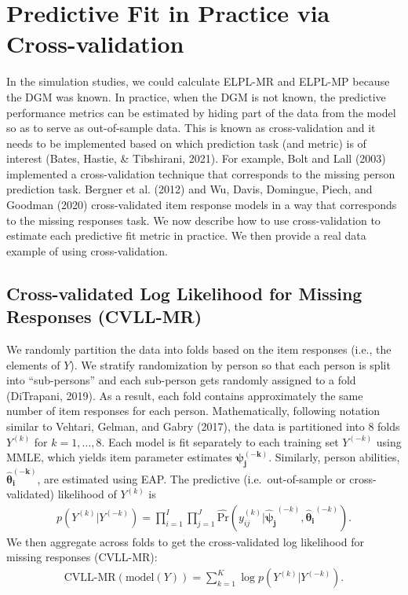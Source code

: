 \documentclass[
  english,
  man,floatsintext]{apa7}
\begin{document}
\hypertarget{real}{%
\section{Predictive Fit in Practice via Cross-validation}\label{real}}

In the simulation studies, we could calculate ELPL-MR and ELPL-MP because the DGM was known. In practice, when the DGM is not known, the predictive performance metrics can be estimated by hiding part of the data from the model so as to serve as out-of-sample data. This is known as cross-validation and it needs to be implemented based on which prediction task (and metric) is of interest (Bates, Hastie, \& Tibshirani, 2021). For example, Bolt and Lall (2003) implemented a cross-validation technique that corresponds to the missing person prediction task. Bergner et al. (2012) and Wu, Davis, Domingue, Piech, and Goodman (2020) cross-validated item response models in a way that corresponds to the missing responses task. We now describe how to use cross-validation to estimate each predictive fit metric in practice. We then provide a real data example of using cross-validation.

\hypertarget{cross-validated-log-likelihood-for-missing-responses-cvll-mr}{%
\subsection{Cross-validated Log Likelihood for Missing Responses (CVLL-MR)}\label{cross-validated-log-likelihood-for-missing-responses-cvll-mr}}

We randomly partition the data into folds based on the item responses (i.e., the elements of \(Y\)). We stratify randomization by person so that each person is split into ``sub-persons'' and each sub-person gets randomly assigned to a fold (DiTrapani, 2019). As a result, each fold contains approximately the same number of item responses for each person. Mathematically, following notation similar to Vehtari, Gelman, and Gabry (2017), the data is partitioned into 8 folds \(Y^{(k)}\) for \(k = 1, \dots, 8\). Each model is fit separately to each training set \(Y^{(-k)}\) using MMLE, which yields item parameter estimates \(\bm{\psi_j^{(-k)}}\). Similarly, person abilities, \(\bm{\hat\theta_i^{(-k)}}\), are estimated using EAP. The predictive (i.e.~out-of-sample or cross-validated) likelihood of \(Y^{(k)}\) is
\begin{align}
p(Y^{(k)} | Y^{(-k)}) = \prod_{i=1}^{I} \prod_{j=1}^{J}  \hat{\text{Pr}}(y_{ij}^{(k)} | \bm{\hat\psi_j}^{(-k)}, \bm{\hat\theta_i}^{(-k)}).
\end{align}
We then aggregate across folds to get the cross-validated log likelihood for missing responses (CVLL-MR):
\begin{align}
\text{CVLL-MR}(\text{model}(Y)) = \sum_{k = 1}^{K} \log p(Y^{(k)} | Y^{(-k)}).
\end{align}
\end{document}
